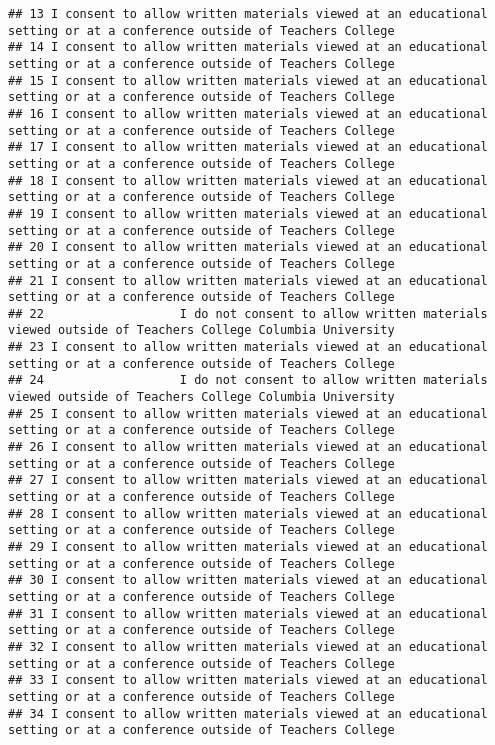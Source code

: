 \documentclass[]{article}
\begin{document}
\begin{verbatim}
## 13 I consent to allow written materials viewed at an educational setting or at a conference outside of Teachers College
## 14 I consent to allow written materials viewed at an educational setting or at a conference outside of Teachers College
## 15 I consent to allow written materials viewed at an educational setting or at a conference outside of Teachers College
## 16 I consent to allow written materials viewed at an educational setting or at a conference outside of Teachers College
## 17 I consent to allow written materials viewed at an educational setting or at a conference outside of Teachers College
## 18 I consent to allow written materials viewed at an educational setting or at a conference outside of Teachers College
## 19 I consent to allow written materials viewed at an educational setting or at a conference outside of Teachers College
## 20 I consent to allow written materials viewed at an educational setting or at a conference outside of Teachers College
## 21 I consent to allow written materials viewed at an educational setting or at a conference outside of Teachers College
## 22                   I do not consent to allow written materials viewed outside of Teachers College Columbia University
## 23 I consent to allow written materials viewed at an educational setting or at a conference outside of Teachers College
## 24                   I do not consent to allow written materials viewed outside of Teachers College Columbia University
## 25 I consent to allow written materials viewed at an educational setting or at a conference outside of Teachers College
## 26 I consent to allow written materials viewed at an educational setting or at a conference outside of Teachers College
## 27 I consent to allow written materials viewed at an educational setting or at a conference outside of Teachers College
## 28 I consent to allow written materials viewed at an educational setting or at a conference outside of Teachers College
## 29 I consent to allow written materials viewed at an educational setting or at a conference outside of Teachers College
## 30 I consent to allow written materials viewed at an educational setting or at a conference outside of Teachers College
## 31 I consent to allow written materials viewed at an educational setting or at a conference outside of Teachers College
## 32 I consent to allow written materials viewed at an educational setting or at a conference outside of Teachers College
## 33 I consent to allow written materials viewed at an educational setting or at a conference outside of Teachers College
## 34 I consent to allow written materials viewed at an educational setting or at a conference outside of Teachers College

\end{verbatim}
\end{document}
